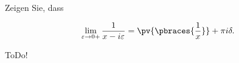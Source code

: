 
\begin{exercise}

Zeigen Sie, dass

\begin{align*}
    \lim_{\varepsilon \to 0+}
    \frac{1}{x - i \varepsilon}
    =
    \pv
    {
        \pbraces
        {
            \frac{1}{x}
        }
    }
    +
    \pi i \delta.
\end{align*}

\end{exercise}


\begin{solution}

ToDo!

\end{solution}

